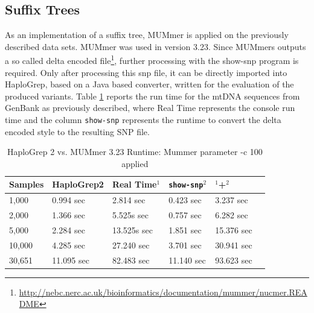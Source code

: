 \subsection{Suffix Trees}
As an implementation of a suffix tree, MUMmer is applied on the previously described data sets. MUMmer was used in version 3.23. Since MUMmers outputs a so called delta encoded file\footnote{\url{http://nebc.nerc.ac.uk/bioinformatics/documentation/mummer/nucmer.README}}, further processing with the show-snp program is required. Only after processing this snp file, it can be directly imported into HaploGrep, based on a Java based converter, written for the evaluation of the produced variants. Table \ref{tableMummer} reports the run time for the mtDNA sequences from GenBank as previously described, where Real Time represents the console run time and the column \texttt{show-snp} represents the runtime to convert the delta encoded style to the resulting SNP file.  
\begin{table}[H]
\centering
\caption{HaploGrep 2 vs. MUMmer 3.23  Runtime: Mummer parameter -c 100 applied }
\label{tableMummer}
\begin{tabular}{|l|l|l|l|l|l|}
\hline
Samples & HaploGrep2 & Real Time$^{1}$ &   \texttt{show-snp$^{2}$} & $^1$+$^2$ \\ \hline
1,000  & 0.994 sec  & 2.814 sec  &     0.423 sec  &  3.237 sec
\\ \hline
2,000  & 1.366 sec  & 5.525s sec &     0.757 sec &  6.282 sec
\\ \hline
5,000  & 2.284 sec    & 13.525s sec &   1.851 sec &  15.376 sec
\\ \hline
10,000 & 4.285 sec  & 27.240 sec  &     3.701 sec & 30.941 sec
\\ \hline 
30,651   & 11.095 sec & 82.483 sec  &   11.140 sec &  93.623 sec
\\ \hline
\end{tabular}
\end{table}
